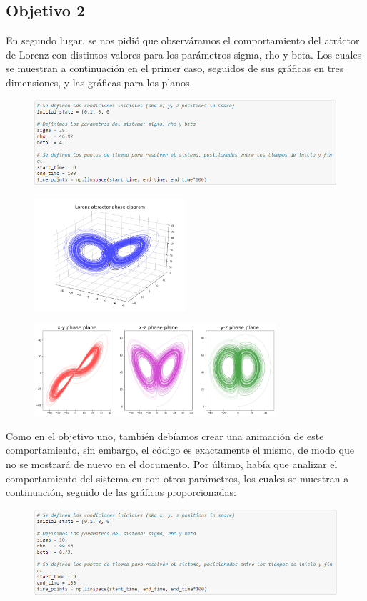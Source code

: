 \documentclass{article}
\begin{document}
\subsection {Objetivo 2}
En segundo lugar, se nos pidió que observáramos el comportamiento del atráctor de Lorenz con distintos valores para los parámetros sigma, rho y beta.
Los cuales se muestran a continuación en el primer caso, seguidos de sus gráficas en tres dimensiones, y las gráficas para los planos.
\begin{figure}[H]
    \includegraphics[width=1\textwidth]{Celda10.PNG}
    \centering
    \label{Cod}
\end{figure}
\begin{figure}[H]
    \includegraphics[width=0.5\textwidth]{Visualizacion2.png}
    \centering
    \label{Grad}
\end{figure}
\begin{figure}[H]
    \includegraphics[width=0.8\textwidth]{GraficasTriples2.png}
    \centering
    \label{Grad}
\end{figure}
Como en el objetivo uno, también debíamos crear una animación de este comportamiento, sin embargo, el código es exactamente el mismo, de modo que no se mostrará de nuevo en el documento.
Por último, había que analizar el comportamiento del sistema en con otros parámetros, los cuales se muestran a continuación, seguido de las gráficas proporcionadas:
\begin{figure}[H]
    \includegraphics[width=1\textwidth]{Celda11.PNG}
    \centering
    \label{Cod}
\end{figure}
\end{document}
